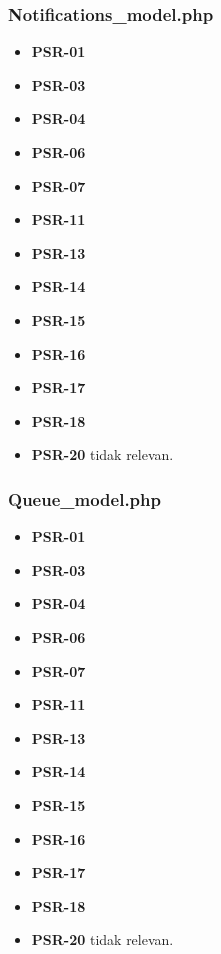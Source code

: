 \subsubsection{Notifications\_model.php}
\begin{itemize}
	\item \textbf{PSR-01} 
	\item \textbf{PSR-03}
	\item \textbf{PSR-04}
	\item \textbf{PSR-06}
	\item \textbf{PSR-07}
	\item \textbf{PSR-11}
	\item \textbf{PSR-13}
	\item \textbf{PSR-14}
	\item \textbf{PSR-15}
	\item \textbf{PSR-16}
	\item \textbf{PSR-17} 
	\item \textbf{PSR-18} 
	\item \textbf{PSR-20} tidak relevan.
\end{itemize}

\subsubsection{Queue\_model.php}
\begin{itemize}
	\item \textbf{PSR-01} 
	\item \textbf{PSR-03}
	\item \textbf{PSR-04}
	\item \textbf{PSR-06}
	\item \textbf{PSR-07}
	\item \textbf{PSR-11}
	\item \textbf{PSR-13}
	\item \textbf{PSR-14}
	\item \textbf{PSR-15}
	\item \textbf{PSR-16}
	\item \textbf{PSR-17} 
	\item \textbf{PSR-18} 
	\item \textbf{PSR-20} tidak relevan.
\end{itemize}

